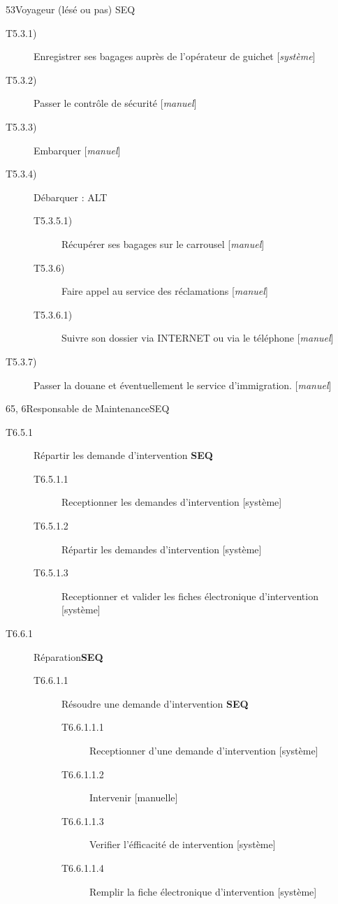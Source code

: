 \dta
{5}{3}{Voyageur (lésé ou pas)}
{SEQ}
{
\begin{description}
	\item [T5.3.1)] Enregistrer ses bagages auprès de l'opérateur de guichet [\textsl{système}]
	\item [T5.3.2)] Passer le contrôle de sécurité [\textsl{manuel}]
	\item [T5.3.3)] Embarquer [\textsl{manuel}]
	\item [T5.3.4)] Débarquer : ALT
	\begin{description}
		\item [T5.3.5.1)] Récupérer ses bagages sur le carrousel [\textsl{manuel}]
		\item [T5.3.6)] Faire appel au service des réclamations [\textsl{manuel}]
		\item [T5.3.6.1)] Suivre son dossier via INTERNET ou via le téléphone [\textsl{manuel}]
	\end{description}
	\item [T5.3.7)] Passer la douane et éventuellement le service d'immigration. [\textsl{manuel}]
\end{description}
}

\dta
{6}{5, 6}{Responsable de Maintenance}{SEQ}
{
\begin{description}
	\item[T6.5.1] Répartir les demande d'intervention \textbf{SEQ}
	\begin{description}
		\item[T6.5.1.1] Receptionner les demandes d'intervention [système]
		\item[T6.5.1.2] Répartir les demandes d'intervention [système]
		\item[T6.5.1.3] Receptionner et valider les fiches électronique d'intervention [système]
	\end{description}
	\item[T6.6.1] Réparation\textbf{SEQ}
	\begin{description}
		\item[T6.6.1.1] Résoudre une demande d'intervention \textbf{SEQ}
		\begin{description}
			\item[T6.6.1.1.1] Receptionner d'une demande d'intervention [système]
			\item[T6.6.1.1.2] Intervenir [manuelle]
			\item[T6.6.1.1.3] Verifier l'éfficacité de intervention [système]
			\item[T6.6.1.1.4] Remplir la fiche électronique d'intervention [système]
		\end{description}
	\end{description}
\end{description}
}

